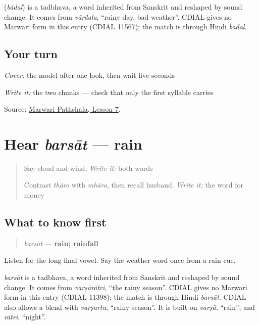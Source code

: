 \begin{cousinweb}
\textbf{} (\emph{bādal}) is a tadbhava, a word inherited from Sanskrit and reshaped by sound change. It comes from \emph{vārdala}, \textquotedblleft{}rainy day, bad weather\textquotedblright{}. CDIAL gives no Marwari form in this entry (CDIAL 11567); the match is through Hindi \emph{bādal}.
\end{cousinweb}

\subsection*{Your turn}
\emph{Cover:} the model after one look, then wait five seconds

\emph{Write it:} the two chunks — check that only the first syllable carries \textbf{}

\begin{tcolorbox}[breakable,colback=teal!4,colframe=teal!35!black,title={Before you move on}]
Source: \href{https://www.marwaripathshala.com/marwari-lesson-7-english}{Marwari Pathshala, Lesson 7}.
\end{tcolorbox}
\section[barsāt]{Hear \emph{barsāt} — rain}

\label{lesson:MW-C11-hear-barsaat}



\begin{quote}
Say cloud and wind. \emph{Write it:} both words

Contrast \emph{thāro} with \emph{mhāro}, then recall husband. \emph{Write it:} the word for money
\end{quote}

\subsection*{What to know first}
\begin{quote}
\emph{barsāt} — \textbf{rain; rainfall}
\end{quote}

Listen for the long final vowel. Say the weather word once from a rain cue.

\begin{cousinweb}
\emph{barsāt} is a tadbhava, a word inherited from Sanskrit and reshaped by sound change. It comes from \emph{varṣārātri}, \textquotedblleft{}the rainy season\textquotedblright{}. CDIAL gives no Marwari form in this entry (CDIAL 11398); the match is through Hindi \emph{barsāt}. CDIAL also allows a blend with \emph{varṣartu}, \textquotedblleft{}rainy season\textquotedblright{}. It is built on \emph{varṣā}, \textquotedblleft{}rain\textquotedblright{}, and \emph{rātri}, \textquotedblleft{}night\textquotedblright{}.
\end{cousinweb}

